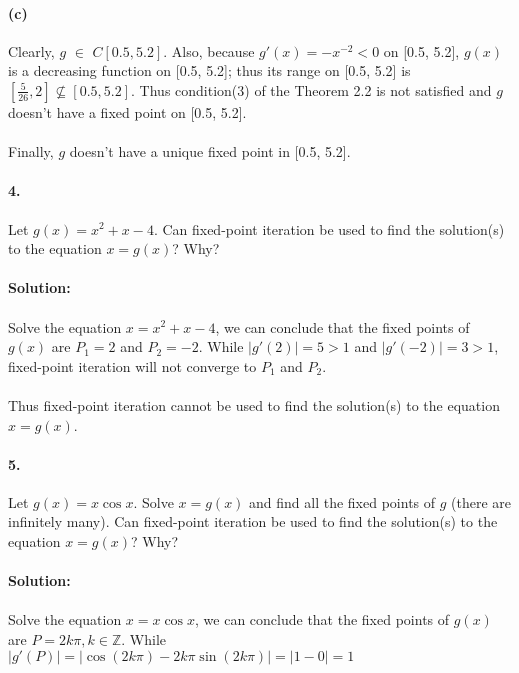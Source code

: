 \documentclass{article}  %
\begin{document}
        \paragraph{(c)}Clearly, \(g\) $\in$ \(C[0.5, 5.2]\). Also, because \(g'(x) = -x^{-2}<0\) on [0.5, 5.2], \(g(x)\) is a decreasing function on [0.5, 5.2]; thus its range on [0.5, 5.2] is $[\frac{5}{26}, 2] \not\subseteq [0.5, 5.2].$ Thus condition(3) of the Theorem 2.2 is not satisfied and $g$ doesn't have a fixed point on [0.5, 5.2].
        \paragraph{}Finally, $g$  doesn't have a unique fixed point in [0.5, 5.2].
        \paragraph{4.}Let $g(x) = x^2 + x - 4$. Can fixed-point iteration be used to find the solution(s) to the equation $x = g(x)$? Why?
        \paragraph{Solution:}
        \paragraph{}Solve the equation $x = x^2 + x - 4$, we can conclude that the fixed points of $g(x)$ are $P_1 = 2$ and $P_2 = -2$. While $|g'(2)| = 5 > 1$ and $|g'(-2)| = 3 > 1$, fixed-point iteration will not converge to $P_1$ and $P_2$.
        \paragraph{}Thus fixed-point iteration cannot be used to find the solution(s) to the equation $x = g(x)$.
        \paragraph{5.}Let $g(x) = x\cos x$. Solve $x = g(x)$ and find all the fixed points of $g$ (there are infinitely many). Can fixed-point iteration be used to find the solution(s) to the equation $x = g(x)$? Why? 
        \paragraph{Solution:}
        \paragraph{}Solve the equation $x = x\cos x$, we can conclude that the fixed points of $g(x)$ are $P = 2k\pi, k \in \mathbb{Z}.$ While $|g'(P)| = |\cos(2k\pi) - 2k\pi\sin(2k\pi)| = |1 - 0| = 1$
\end{document}
